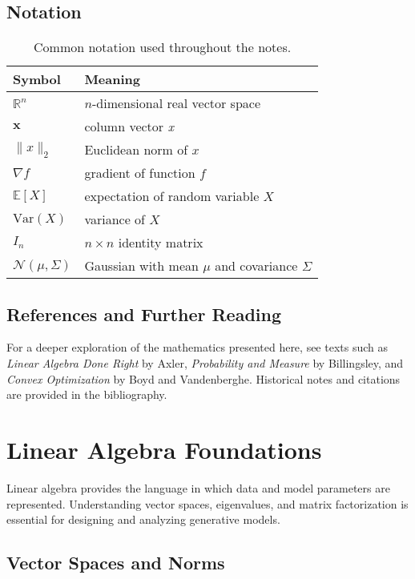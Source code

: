 \documentclass[11pt]{book}
\begin{document}
\section{Notation}
\begin{table}[h]
    \centering
    \begin{tabular}{ll}
        \hline
        Symbol & Meaning \\ \hline
        $\mathbb{R}^n$ & $n$-dimensional real vector space \\
        $\mathbf{x}$ & column vector \emph{x} \\
        $\|x\|_2$ & Euclidean norm of $x$ \\
        $\nabla f$ & gradient of function $f$ \\
        $\mathbb{E}[X]$ & expectation of random variable $X$ \\
        $\mathrm{Var}(X)$ & variance of $X$ \\
        $I_n$ & $n\times n$ identity matrix \\
        $\mathcal{N}(\mu,\Sigma)$ & Gaussian with mean $\mu$ and covariance $\Sigma$ \\
        \hline
    \end{tabular}
    \caption{Common notation used throughout the notes.}
\end{table}

\section{References and Further Reading}
For a deeper exploration of the mathematics presented here, see texts such as \emph{Linear Algebra Done Right} by Axler, \emph{Probability and Measure} by Billingsley, and \emph{Convex Optimization} by Boyd and Vandenberghe. Historical notes and citations are provided in the bibliography.

\chapter{Linear Algebra Foundations}
Linear algebra provides the language in which data and model parameters are represented. Understanding vector spaces, eigenvalues, and matrix factorization is essential for designing and analyzing generative models.

\section{Vector Spaces and Norms}
\end{document}

